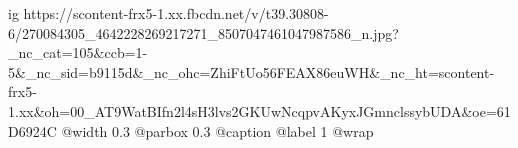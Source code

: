  
 
 
 
 

\ifcmt
  ig https://scontent-frx5-1.xx.fbcdn.net/v/t39.30808-6/270084305_4642228269217271_8507047461047987586_n.jpg?_nc_cat=105&ccb=1-5&_nc_sid=b9115d&_nc_ohc=ZhiFtUo56FEAX86euWH&_nc_ht=scontent-frx5-1.xx&oh=00_AT9WatBIfn2l4sH3lvs2GKUwNcqpvAKyxJGmnclssybUDA&oe=61D6924C
  @width 0.3
  @parbox 0.3
  @caption @label 1
  @wrap \parpic[l]
\fi
